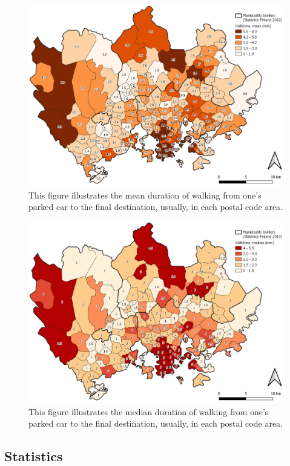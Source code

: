 \begin{figure}[H]%
    \centering
    \includegraphics[width=.88\textwidth]{images/thesis_postalvis_walkmean.png}
    \caption[Walktime, mean, in the research area]{This figure illustrates the mean duration of walking from one's parked car to the final destination, usually, in each postal code area.}%
    \label{fig:postalvis_walkmean}%
\end{figure}

\begin{figure}[H]%
    \centering
    \includegraphics[width=.88\textwidth]{images/thesis_postalvis_walkmedian.png}
    \caption[Walktime, median, in the research area]{This figure illustrates the median duration of walking from one's parked car to the final destination, usually, in each postal code area.}%
    \label{fig:postalvis_walkmedian}%
\end{figure}

\subsection{Statistics}
\justify

